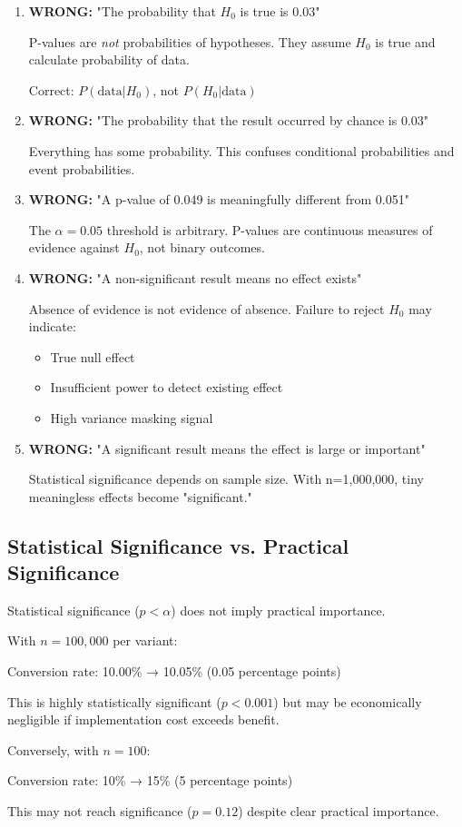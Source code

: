 \begin{enumerate}
    \item \textbf{WRONG:} "The probability that $H_0$ is true is 0.03"

    P-values are \textit{not} probabilities of hypotheses. They assume $H_0$ is true and calculate probability of data.

    Correct: $P(\text{data}|H_0)$, not $P(H_0|\text{data})$

    \item \textbf{WRONG:} "The probability that the result occurred by chance is 0.03"

    Everything has some probability. This confuses conditional probabilities and event probabilities.

    \item \textbf{WRONG:} "A p-value of 0.049 is meaningfully different from 0.051"

    The $\alpha = 0.05$ threshold is arbitrary. P-values are continuous measures of evidence against $H_0$, not binary outcomes.

    \item \textbf{WRONG:} "A non-significant result means no effect exists"

    Absence of evidence is not evidence of absence. Failure to reject $H_0$ may indicate:
    \begin{itemize}
        \item True null effect
        \item Insufficient power to detect existing effect
        \item High variance masking signal
    \end{itemize}

    \item \textbf{WRONG:} "A significant result means the effect is large or important"

    Statistical significance depends on sample size. With n=1,000,000, tiny meaningless effects become "significant."
\end{enumerate}

\subsection{Statistical Significance vs. Practical Significance}

Statistical significance ($p < \alpha$) does not imply practical importance.

\begin{example}
With $n = 100{,}000$ per variant:

Conversion rate: 10.00\% → 10.05\% (0.05 percentage points)

This is highly statistically significant ($p < 0.001$) but may be economically negligible if implementation cost exceeds benefit.

Conversely, with $n = 100$:

Conversion rate: 10\% → 15\% (5 percentage points)

This may not reach significance ($p = 0.12$) despite clear practical importance.
\end{example}

